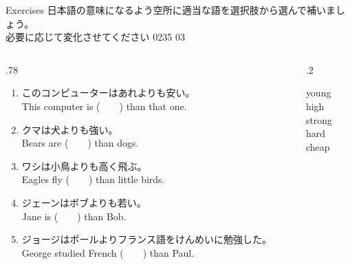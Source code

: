 \documentclass[aspectratio=169,xcolor={dvipsnames,table}]{beamer}
\begin{document}
\begin{frame}[plain]{Exercises}
日本語の意味になるよう空所に適当な語を選択肢から選んで補いましょう。\\必要に応じて変化させてください%
\hfill{\tiny 0235}\,{\tiny {}\,03}

\begin{columns}[t]
 \begin{column}{.78\textwidth}
   \begin{enumerate}
  \item このコンピューターはあれよりも安い。\\
	This computer is (~~~~) than that one. 
    \item クマは犬よりも強い。\\
	Bears are (~~~~) than dogs. 
    \item ワシは小鳥よりも高く飛ぶ。\\
	Eagles fly (~~~~) than little birds. 
    \item ジェーンはボブよりも若い。\\
	Jane is (~~~~) than Bob. 
    \item ジョージはポールよりフランス語をけんめいに勉強した。\\
	George studied French (~~~~) than Paul. 
 \end{enumerate}
 \end{column}
\begin{column}{.2\textwidth}
 \begin{tcolorbox}
  young\\
  high\\
  strong\\
  hard\\
  cheap
 \end{tcolorbox}
\end{column}
\end{columns}
\end{frame}
\end{document}
